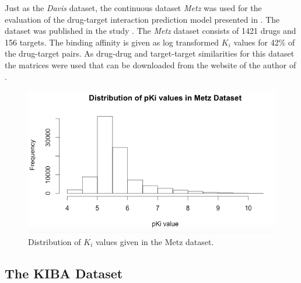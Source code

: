 Just as the \textit{Davis} dataset, the continuous dataset \textit{Metz} was used for the evaluation of the drug-target interaction prediction model presented in \cite{pahikkala2014toward}. The dataset was published in the study \cite{metz2011navigating}. The \textit{Metz} dataset consists of 1421 drugs and 156 targets. The binding affinity is given as log transformed $K_i$ values for 42$\%$ of the drug-target pairs. As drug-drug and target-target similarities for this dataset the matrices were used that can be downloaded from the website of the author of \cite{pahikkala2014toward}.
\begin{figure}
\begin{center}
\includegraphics[scale=0.6]{metz_dist.png}
\end{center}
\caption{Distribution of $K_i$ values given in the Metz dataset.}
\label{fig:numStructure}
\end{figure}

\subsection{The KIBA Dataset}

